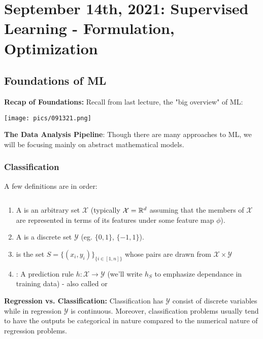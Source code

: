 \documentclass[11pt]{scrartcl}
\begin{document}
\newpage

\section{September 14th, 2021: Supervised Learning - Formulation, Optimization}

\subsection{Foundations of ML}

\textbf{Recap of Foundations:} Recall from last lecture, the "big overview" of ML:
\begin{center}
    \texttt{[image: pics/091321.png]}
\end{center}

\textbf{The Data Analysis Pipeline}: Though there are many approaches to ML, we will be focusing mainly on abstract mathematical models.

\subsubsection{Classification}
A few definitions are in order:
\begin{defn}
$~$
\begin{enumerate}[label=(\alph*)]
    \item A  is an arbitrary set $\mathcal{X}$ (typically $\mathcal{X}=\mathbb{R}^d$ assuming that the members of $\mathcal{X}$ are represented in terms of its features under some feature map $\phi$). 
    \item A  is a discrete set $\mathcal{Y}$ (eg. $\{0,1\}$, $\{-1,1\}$).
    \item {} is the set $S=\{(x_i,y_i)\}_{\{i \in [1,n]\}}$ whose pairs are drawn from $\mathcal{X} \times \mathcal{Y}$
    \item {}: A prediction rule $h: \mathcal{X} \to \mathcal{Y}$ (we'll write $h_S$ to emphasize dependance in training data) - also called  or 
\end{enumerate}
\end{defn}

\textbf{Regression vs. Classification:} Classification has $\mathcal{Y}$ consist of discrete variables while in regression $\mathcal{Y}$ is continuous. Moreover, classification problems usually tend to have the outputs be categorical in nature compared to the numerical nature of regression problems.
\end{document}
